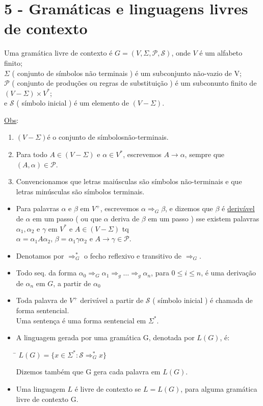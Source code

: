 \documentclass{article}
\begin{document}
\section{5 - Gramáticas e linguagens livres de contexto}
    Uma gramática livre de contexto é $ G = ( V, \Sigma, \mathcal{P}, \mathcal{S} ) $, onde
$ V $ é um alfabeto finito;\\
$\Sigma$ ( conjunto de símbolos não terminais ) é um subconjunto não-vazio de V;\\
$\mathcal{P}$ ( conjunto de produções ou regras de substituição ) é um subconunto 
        finito de $ ( V - \Sigma )\times V^* $;\\
e $ \mathcal{S} $ ( símbolo inicial ) é um elemento de $ ( V - \Sigma ) $.

\underline{Obs}:
\begin{enumerate}
    \item $ ( V - \Sigma ) $é o conjunto de símbolosnão-terminais.
    \item Para todo $ A \in ( V - \Sigma ) $ e $ \alpha \in V^* $, escrevemos $ A \rightarrow \alpha $, sempre que 
            $ (A,\alpha) \in \mathcal{P} $.
    \item Convencionamos que letras maiúsculas são símbolos não-terminais e que letras minúsculas são símbolos terminais.
\end{enumerate}    
\begin{itemize}
    \item Para palavras $ \alpha $ e $ \beta $ em $ V^+ $, escrevemos $ \alpha \Longrightarrow_G \beta $, e dizemos
            que $ \beta $ é \underline{derivável} de $ \alpha $ em um passo ( ou que $ \alpha $ deriva de $ \beta $ 
            em um passo ) sse existem palavras $ \alpha_1, \alpha_2 $ e $ \gamma $ em $ V^* $ e $ A \in (V-\Sigma) $ tq\\
            $ \alpha = \alpha_1A\alpha_2 $, $ \beta = \alpha_1\gamma\alpha_2 $ e $ A \rightarrow \gamma \in \mathcal{P} $.
    \item Denotamos por $ \Rightarrow_G^* $ o fecho reflexivo e transitivo de $ \Rightarrow_G $.
    \item Todo seq. da forma $ \alpha_0 \Rightarrow_G \alpha_1 \Rightarrow_g \dots \Rightarrow_g \alpha_n $,
            para $ 0 \leq i \leq n $, é uma derivação de $ \alpha_n $ em $ G $, a partir de $ \alpha_0 $
    \item Toda palavra de $ V^+ $ derivável a partir de $ \mathcal{S} $ ( símbolo inicial ) é 
            chamada de forma sentencial.\\
            Uma sentença é uma forma sentencial em $ \Sigma^* $.
    \item A linguagem gerada por uma gramática G, denotada por $ L(G) $, é:
        \begin{tabbing}
            \hspace{1cm}\= $ L(G) = \{ x \in \Sigma^* : \mathcal{S} \Rightarrow_G^* x \} $
        \end{tabbing}
        Dizemos também que G gera cada palavra em $ L(G) $.
    \item Uma linguagem $ L $ é livre de contexto se $ L = L(G) $, para alguma gramática livre de contexto G. 
\end{itemize}
\end{document}
